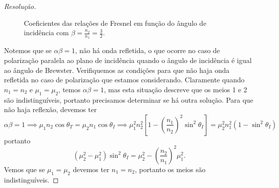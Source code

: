 \begin{proof}[Resolução]
    \begin{figure}[!ht]
         \centering
        \caption{Coeficientes das relações de Fresnel em função do ângulo de incidência com \(\beta = \frac{n_2}{n_1} = \frac32\).}
    \end{figure}

    Notemos que se \(\alpha \beta = 1\), não há onda refletida, o que ocorre no caso de polarização paralela ao plano de incidência quando o ângulo de incidência é igual ao ângulo de Brewster. Verifiquemos as condições para que não haja onda refletida no caso de polarização que estamos considerando. Claramente quando \(n_1 = n_2\) e \(\mu_1 = \mu_2\), temos \(\alpha \beta = 1\), mas esta situação descreve que os meios 1 e 2 são indistinguíveis, portanto precisamos determinar se há outra solução. Para que não haja reflexão, devemos ter
    \begin{equation*}
        \alpha \beta = 1 \implies \mu_1 n_2 \cos\theta_T = \mu_2 n_1 \cos\theta_I \implies \mu_1^2 n_2^2 \left[1 - \left(\frac{n_1}{n_2}\right)^2 \sin^2\theta_I\right] = \mu_2^2 n_1^2 \left(1 - \sin^2 \theta_I\right)
    \end{equation*}
    portanto
    \begin{equation*}
        \left(\mu_2^2 - \mu_1^2\right)\sin^2\theta_I = \mu_2^2 - \left(\frac{n_2}{n_1}\right)^2\mu_1^2.
    \end{equation*}
    Vemos que se \(\mu_1 = \mu_2\) devemos ter \(n_1 = n_2\), portanto os meios são indistinguíveis. \todo


\end{proof}
